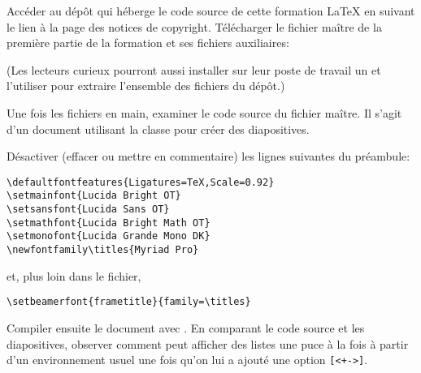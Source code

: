 \begin{exercice}
  Accéder au dépôt qui héberge le code source de cette formation
  {\LaTeX} en suivant le lien à la page des notices de copyright.
  Télécharger le fichier maître de la première partie de la formation
  et ses fichiers auxiliaires:

  \medskip
  \begin{minipage}{\linewidth}
  \end{minipage}
  \medskip

  (Les lecteurs curieux pourront aussi installer sur leur poste de
  travail un %
  et l'utiliser pour extraire l'ensemble des fichiers du dépôt.)

  Une fois les fichiers en main, examiner le code source du fichier
  maître. Il s'agit d'un document utilisant la classe 
  pour créer des diapositives.

  Désactiver (effacer ou mettre en commentaire) les lignes suivantes
  du préambule:
\begin{lstlisting}
\defaultfontfeatures{Ligatures=TeX,Scale=0.92}
\setmainfont{Lucida Bright OT}
\setsansfont{Lucida Sans OT}
\setmathfont{Lucida Bright Math OT}
\setmonofont{Lucida Grande Mono DK}
\newfontfamily\titles{Myriad Pro}
\end{lstlisting}
  et, plus loin dans le fichier,
\begin{lstlisting}
\setbeamerfont{frametitle}{family=\titles}
\end{lstlisting}
  Compiler ensuite le document avec {\XeLaTeX}. En comparant le code
  source et les diapositives, observer comment  peut
  afficher des listes une puce à la fois à partir d'un environnement
   usuel une fois qu'on lui a ajouté une option
  \verb=[<+->]=.
\end{exercice}



